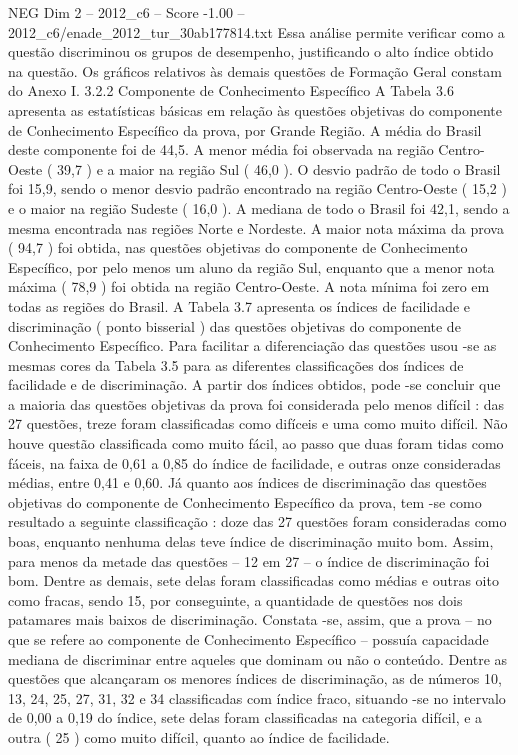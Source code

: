 \begin{textsample}{NEG Dim 2 – 2012\_c6 – Score -1.00 – 2012\_c6/enade\_2012\_tur\_30ab177814.txt}
Essa análise permite verificar como a questão discriminou os grupos de desempenho, justificando o alto índice obtido na questão.
Os gráficos relativos às demais questões de Formação Geral constam do Anexo I. 3.2.2 Componente de Conhecimento Específico A Tabela 3.6 apresenta as estatísticas básicas em relação às questões objetivas do componente de Conhecimento Específico da prova, por Grande Região.
A média do Brasil deste componente foi de 44,5.
A menor média foi observada na região Centro-Oeste ( 39,7 ) e a maior na região Sul ( 46,0 ).
O desvio padrão de todo o Brasil foi 15,9, sendo o menor desvio padrão encontrado na região Centro-Oeste ( 15,2 ) e o maior na região Sudeste ( 16,0 ).
A mediana de todo o Brasil foi 42,1, sendo a mesma encontrada nas regiões Norte e Nordeste.
A maior nota máxima da prova ( 94,7 ) foi obtida, nas questões objetivas do componente de Conhecimento Específico, por pelo menos um aluno da região Sul, enquanto que a menor nota máxima ( 78,9 ) foi obtida na região Centro-Oeste.
A nota mínima foi zero em todas as regiões do Brasil.
A Tabela 3.7 apresenta os índices de facilidade e discriminação ( ponto bisserial ) das questões objetivas do componente de Conhecimento Específico.
Para facilitar a diferenciação das questões usou -se as mesmas cores da Tabela 3.5 para as diferentes classificações dos índices de facilidade e de discriminação.
A partir dos índices obtidos, pode -se concluir que a maioria das questões objetivas da prova foi considerada pelo menos difícil : das 27 questões, treze foram classificadas como difíceis e uma como muito difícil.
Não houve questão classificada como muito fácil, ao passo que duas foram tidas como fáceis, na faixa de 0,61 a 0,85 do índice de facilidade, e outras onze consideradas médias, entre 0,41 e 0,60.
Já quanto aos índices de discriminação das questões objetivas do componente de Conhecimento Específico da prova, tem -se como resultado a seguinte classificação : doze das 27 questões foram consideradas como boas, enquanto nenhuma delas teve índice de discriminação muito bom.
Assim, para menos da metade das questões – 12 em 27 – o índice de discriminação foi bom.
Dentre as demais, sete delas foram classificadas como médias e outras oito como fracas, sendo 15, por conseguinte, a quantidade de questões nos dois patamares mais baixos de discriminação.
Constata -se, assim, que a prova – no que se refere ao componente de Conhecimento Específico – possuía capacidade mediana de discriminar entre aqueles que dominam ou não o conteúdo.
Dentre as questões que alcançaram os menores índices de discriminação, as de números 10, 13, 24, 25, 27, 31, 32 e 34 classificadas com índice fraco, situando -se no intervalo de 0,00 a 0,19 do índice, sete delas foram classificadas na categoria difícil, e a outra ( 25 ) como muito difícil, quanto ao índice de facilidade.

\end{textsample}
